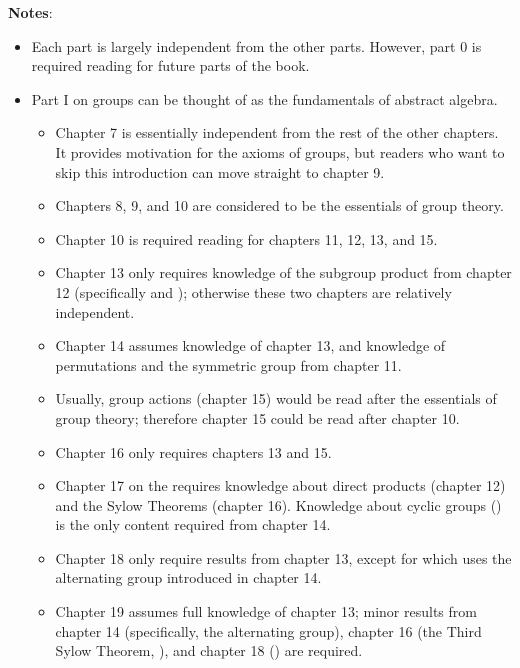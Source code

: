 \newpage
\begin{center}
\end{center}

\newpage

\textbf{Notes}:
\begin{itemize}
    \item Each part is largely independent from the other parts. However, part 0 is required reading for future parts of the book.
    \item Part I on groups can be thought of as the fundamentals of abstract algebra.
    \begin{itemize}
        \item Chapter 7 is essentially independent from the rest of the other chapters. It provides motivation for the axioms of groups, but readers who want to skip this introduction can move straight to chapter 9.
        \item Chapters 8, 9, and 10 are considered to be the essentials of group theory.
        \item Chapter 10 is required reading for chapters 11, 12, 13, and 15.
        \item Chapter 13 only requires knowledge of the subgroup product from chapter 12 (specifically  and ); otherwise these two chapters are relatively independent.
        \item Chapter 14 assumes knowledge of chapter 13, and knowledge of permutations and the symmetric group from chapter 11.
        \item Usually, group actions (chapter 15) would be read after the essentials of group theory; therefore chapter 15 could be read after chapter 10.
        \item Chapter 16 only requires chapters 13 and 15.
        \item Chapter 17 on the requires knowledge about direct products (chapter 12) and the Sylow Theorems (chapter 16). Knowledge about cyclic groups () is the only content required from chapter 14.
        \item Chapter 18 only require results from chapter 13, except for  which uses the alternating group introduced in chapter 14.
        \item Chapter 19 assumes full knowledge of chapter 13; minor results from chapter 14 (specifically, the alternating group), chapter 16 (the Third Sylow Theorem, ), and chapter 18 () are required.

\end{itemize}
\end{itemize}
